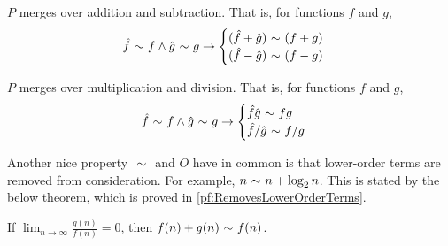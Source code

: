 \begin{theorem}
\label{thm:MergesOverArithmeticAdd}
	$P$ merges over addition and subtraction. That is, for functions $f$ and $g$,
	\begin{align*}
	\hat{f} \ \mathtt{\sim}\  f \land \hat{g} \ \mathtt{\sim}\  g \rightarrow \begin{cases}
		(\hat{f} + \hat{g}) \ \mathtt{\sim}\  (f + g)\\
		(\hat{f} - \hat{g}) \ \mathtt{\sim}\  (f - g)
	\end{cases}
	\end{align*}
\end{theorem}

\begin{theorem}
\label{thm:MergesOverArithmeticMultiply}
	$P$ merges over multiplication and division. That is, for functions $f$ and $g$,
	\begin{align*}
	\hat{f} \ \mathtt{\sim}\  f \land \hat{g} \ \mathtt{\sim}\  g \rightarrow \begin{cases}
	\hat{f}\hat{g} \ \mathtt{\sim}\  fg\\
	\hat{f} / \hat{g} \ \mathtt{\sim}\  f / g
	\end{cases}
	\end{align*}
\end{theorem}

Another nice property $\ \mathtt{\sim}\ $ and $O$ have in common is that lower-order terms are removed from consideration. For example, $n \ \mathtt{\sim}\  n + \log_2 n$. This is stated by the below theorem, which is proved in \ref{pf:RemovesLowerOrderTerms}.

\begin{theorem}
	If $\lim_{n \to \infty} \frac{g(n)}{f(n)} = 0$, then $f(n) + g(n) \ \mathtt{\sim}\  f(n)$.
\end{theorem}